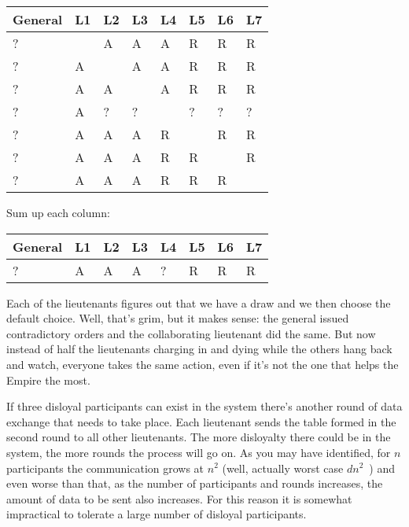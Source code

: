 \begin{center}
	\begin{tabular}{|l|l|l|l|l|l|l|l|}
		\hline
		General & L1 & L2 & L3 & L4 & L5 & L6 & L7 \\
		\hline
		?       & ~  & A  & A  & A  & R  & R  & R  \\ \hline
		?       & A  & ~  & A  & A  & R  & R  & R  \\ \hline
		?       & A  & A  & ~  & A  & R  & R  & R  \\ \hline
		?       & A  & ?  & ?  & ~  & ?  & ?  & ?  \\ \hline
		?       & A  & A  & A  & R  & ~  & R  & R  \\ \hline
		?       & A  & A  & A  & R  & R  & ~  & R  \\ \hline
		?       & A  & A  & A  & R  & R  & R  & ~  \\ \hline
	\end{tabular}
\end{center}

Sum up each column:

\begin{center}
	\begin{tabular}{|l|l|l|l|l|l|l|l|}
		\hline
		General & L1 & L2 & L3 & L4 & L5 & L6 & L7 \\
		\hline
		?       & A  & A  & A  & ?  & R  & R  & R  \\
		\hline
	\end{tabular}
\end{center}

Each of the lieutenants figures out that we have a draw and we then choose the default choice. Well, that's grim, but it makes sense: the general issued contradictory orders and the collaborating lieutenant did the same. But now instead of half the lieutenants charging in and dying while the others hang back and watch, everyone takes the same action, even if it's not the one that helps the Empire the most.

If three disloyal participants can exist in the system there's another round of data exchange that needs to take place. Each lieutenant sends the table formed in the second round to all other lieutenants. The more disloyalty there could be in the system, the more rounds the process will go on. As you may have identified, for $n$ participants the communication grows at $n^{2}$ (well, actually worst case $dn^{2}$~\cite{mte241}) and even worse than that, as the number of participants and rounds increases, the amount of data to be sent also increases. For this reason it is somewhat impractical to tolerate a large number of disloyal participants.

